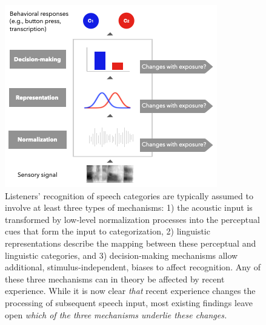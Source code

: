 \documentclass[
  11pt,
  english,
  man,floatsintext]{apa6}
\begin{document}
\begin{figure}[h]
\begin{center}
\includegraphics[width=0.6\columnwidth]{../figures/diagrams/overview-of-three-mechanisms2.png}
\caption{Listeners' recognition of speech categories are typically assumed to involve at least three types of mechanisms: 1) the acoustic input is transformed by low-level normalization processes into the perceptual cues that form the input to categorization, 2) linguistic representations describe the mapping between these perceptual and linguistic categories, and 3) decision-making mechanisms allow additional, stimulus-independent, biases to affect recognition. Any of these three mechanisms can in theory be affected by recent experience. While it is now clear \emph{that} recent experience changes the processing of subsequent speech input, most existing findings leave open \emph{which of the three mechanisms underlie these changes.}}\label{fig:overview}
\end{center}
\end{figure}
\end{document}
